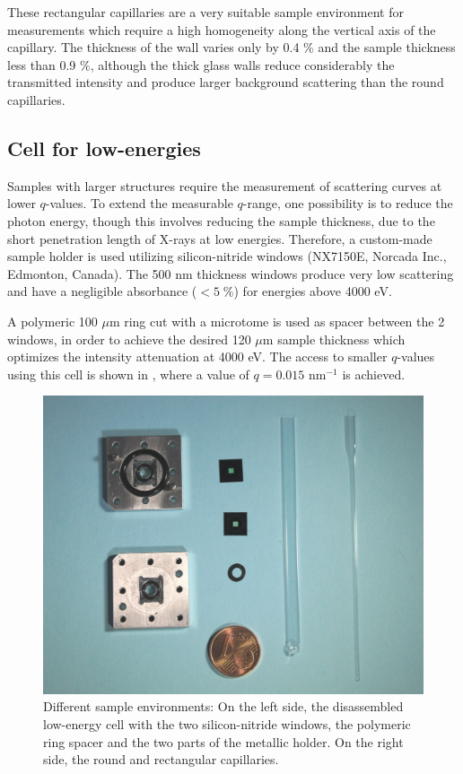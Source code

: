 These rectangular capillaries are a very suitable sample environment for measurements which require a high homogeneity along the vertical axis of the capillary. The thickness of the wall varies only by 0.4 $\%$ and the sample thickness less than 0.9 $\%$, although the thick glass walls reduce considerably the transmitted intensity and produce larger background scattering than the round capillaries.

\subsection{Cell for low-energies}

Samples with larger structures require the measurement of scattering curves at lower $q$-values. To extend the measurable $q$-range, one possibility is to reduce the photon energy, though this involves reducing the sample thickness, due to the short penetration length of X-rays at low energies. Therefore, a custom-made sample holder is used utilizing silicon-nitride windows (NX7150E, Norcada Inc., Edmonton, Canada). The 500 nm thickness windows produce very low scattering and have a negligible absorbance ($<5\;\%$) for energies above 4000 eV.

A polymeric 100 $\mu$m ring cut with a microtome is used as spacer between the 2 windows, in order to achieve the desired 120 $\mu$m sample thickness which optimizes the intensity attenuation at 4000 eV. The access to smaller $q$-values using this cell is shown in \cite{varga_towards_2014}, where a value of $q=0.015$ nm$^{-1}$ is achieved.

\begin{figure}%
		\includegraphics[width=0.9\linewidth]{Figures/SampleEnvironment.jpg}
		\caption[Sample environments for SAXS experiments in vacuum.]{Different sample environments: On the left side, the disassembled low-energy cell with the two silicon-nitride windows, the polymeric ring spacer and the two parts of the metallic holder. On the right side, the round and rectangular capillaries.}
	        \label{fig:SampleEnvironment}
\end{figure}

